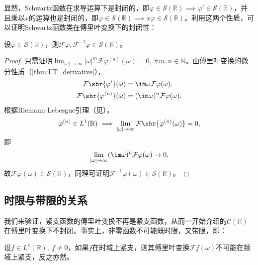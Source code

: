 显然，Schwartz函数在求导运算下是封闭的，即$\varphi\in\mathcal{S}(\mathbb{R})\implies \varphi'\in\mathcal{S}(\mathbb{R})$，并且乘以$x$的运算也是封闭的，即$\varphi\in\mathcal{S}(\mathbb{R})\implies x\varphi\in\mathcal{S}(\mathbb{R})$。利用这两个性质，可以证明Schwartz函数类在傅里叶变换下的封闭性：
\begin{theorem}[Schwartz函数类在傅里叶变换下的封闭性]
    \label{thm:schwartz_close}
    设$\varphi\in\mathcal{S}(\mathbb{R})$，则$\mathcal{F} \varphi,\mathcal{F}^{-1}\varphi\in\mathcal{S}(\mathbb{R})$。
\end{theorem}
\begin{proof}
    只需证明$\lim_{|\omega|\to\infty}|\omega|^m\mathcal{F}\varphi^{(n)}(\omega)=0,\ \forall m,n\in\mathbb{N}$。由傅里叶变换的微分性质（\cref{thm:FT_derivative}），
    \begin{align}
        \mathcal{F}\sbr{\varphi'}(\omega)&=\im\omega \mathcal{F}\varphi(\omega), \\
        \mathcal{F}\sbr{\varphi^{(n)}}(\omega)&=(\im\omega)^n \mathcal{F}\varphi(\omega).
    \end{align}
    根据Riemann-Lebesgue引理（见），
    \begin{equation}
        \varphi^{(n)}\in L^1(\mathbb{R})\implies\lim_{|\omega|\to\infty}\mathcal{F}\sbr{\varphi^{(n)}(\omega)}=0,
    \end{equation}
    即
    \begin{equation}
        \lim_{|\omega|\to\infty}(\im\omega)^n \mathcal{F}\varphi(\omega)\to 0,
    \end{equation}
    故$\mathcal{F}\varphi(\omega)\in\mathcal{S}(\mathbb{R})$，同理可证明$\mathcal{F}^{-1}\varphi(\omega)\in\mathcal{S}(\mathbb{R})$。
\end{proof}

\subsection{时限与带限的关系}\label{sub:time_freq_limit}
我们来验证，紧支函数的傅里叶变换不再是紧支函数，从而一开始介绍的$\mathcal{C}(\mathbb{R})$在傅里叶变换下不封闭。事实上，非零函数不可能既时限，又带限，即：
\begin{theorem}
    \label{thm:time_freq_limit}
    设$f\in L^1(\mathbb{R}),\ f\neq 0$，如果$f$在时域上紧支，则其傅里叶变换$\mathcal{F} f(\omega)$不可能在频域上紧支，反之亦然。
\end{theorem}

